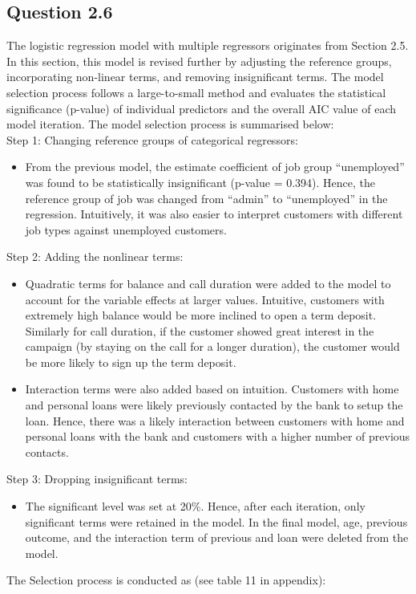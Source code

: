 \documentclass[11pt]{article}
\begin{document}
{\subsection*{Question 2.6}
The logistic regression model with multiple regressors originates from Section 2.5. In this section, this model is revised further by adjusting the reference groups, incorporating non-linear terms, and removing insignificant terms. The model selection process follows a large-to-small method and evaluates the statistical significance (p-value) of individual predictors and the overall AIC value of each model iteration. The model selection process is summarised below:\\

Step 1: Changing reference groups of categorical regressors:\\
\begin{itemize}
\item From the previous model, the estimate coefficient of job group “unemployed” was found to be statistically insignificant (p-value = 0.394). Hence, the reference group of job was changed from “admin” to “unemployed” in the regression. Intuitively, it was also easier to interpret customers with different job types against unemployed customers. 
\end{itemize}
Step 2: Adding the nonlinear terms:\\
\begin{itemize}
\item Quadratic terms for balance and call duration were added to the model to account for the variable effects at larger values. Intuitive, customers with extremely high balance would be more inclined to open a term deposit. Similarly for call duration, if the customer showed great interest in the campaign (by staying on the call for a longer duration), the customer would be more likely to sign up the term deposit.
\item Interaction terms were also added based on intuition. Customers with home and personal loans were likely previously contacted by the bank to setup the loan. Hence, there was a likely interaction between customers with home and personal loans with the bank and customers with a higher number of previous contacts.
\end{itemize}
Step 3: Dropping insignificant terms:  
\begin{itemize}
\item The significant level was set at 20\%. Hence, after each iteration, only significant terms were retained in the model. In the final model, age, previous outcome, and the interaction term of previous and loan were deleted from the model. 
\end{itemize}
The Selection process is conducted as (see table 11 in appendix):\\

}
\end{document}
